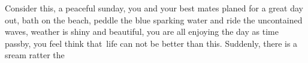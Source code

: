 Consider this, a peaceful sunday, you and your best mates planed for a great day out, bath on the beach, peddle the blue sparking water and ride the uncontained waves, weather is shiny and beautiful, you are all enjoying the day as time passby, you feel think that\ life can not be better than this. Suddenly, there is a sream ratter the 